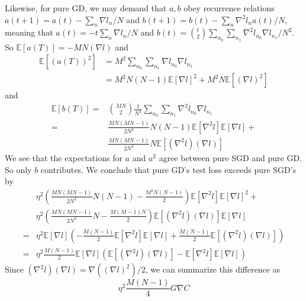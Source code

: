 \documentclass{article}
\newcommand{\expct}[1]{\mathbb{E}\left[#1\right]}
\newcommand{\wrap}[1]{\left( #1 \right)}
\begin{document}
        Likewise, for pure GD, we may demand that $a, b$ obey recurrence
        relations $a(t+1) = a(t) - \sum_n \nabla l_n/N$ and
        $b(t+1) = b(t) - \sum_n \nabla^2 l_n a(t)/N$, meaning that
        $a(t) = -t \sum_n \nabla l_n/N$ and
        $b(t) = {t \choose 2} \sum_{n_0} \sum_{n_1} \nabla^2 l_{n_0} \nabla l_{n_1}/N^2$.
        So $\expct{a(T)} = -MN(\nabla l)$ and
        \begin{align*}
            \expct{(a(T))^2}
            &=
            M^2 
            \sum_{n_0} \sum_{n_1} \nabla l_{n_0} \nabla l_{n_1} \\
            &= 
            M^2 N(N-1)  \expct{\nabla l}^2 + 
            M^2 N       \expct{(\nabla l)^2}
        \end{align*}
        and
        \begin{align*}
            \expct{b(T)}
            = 
            &{MN \choose 2}\frac{1}{N^2}
            \sum_{n_0} \sum_{n_1} \nabla^2 l_{n_0} \nabla l_{n_1} \\
            =
            &\frac{MN(MN-1)}{2N^2} N(N-1) \expct{\nabla^2 l} \expct{\nabla l} + \\
            &\frac{MN(MN-1)}{2N^2} N      \expct{(\nabla^2 l) (\nabla l)} 
        \end{align*}
        We see that the expectations for $a$ and $a^2$ agree between pure SGD and
        pure GD.  So only $b$ contributes.  We conclude that pure GD's test loss
        exceeds pure SGD's by
        \begin{align*}
               &\eta^2
                \wrap{\frac{MN(MN-1)}{2N^2} N(N-1) - \frac{M^2N(N-1)}{2}}
                \expct{\nabla^2 l} \expct{\nabla l}^2 + \\
               &\eta^2 
                \wrap{\frac{MN(MN-1)}{2N^2} N - \frac{M(M-1)N}{2}}
                \expct{(\nabla^2 l) (\nabla l)} \expct{\nabla l} \\
            = 
                &\eta^2     \expct{\nabla l} \wrap{
                -\frac{M(N-1)}{2} \expct{\nabla^2 l} \expct{\nabla l} 
                +\frac{M(N-1)}{2} \expct{(\nabla^2 l) (\nabla l)}
            } \\
            = 
                &\eta^2     \frac{M(N-1)}{2}
            \expct{\nabla l} \wrap{
                  \expct{(\nabla^2 l) (\nabla l)}
                - \expct{\nabla^2 l} \expct{\nabla l}
            }
        \end{align*}
        Since $(\nabla^2 l) (\nabla l) = \nabla((\nabla l)^2)/2$, we can 
        summarize this difference as
        $$
            \eta^2 \frac{M(N-1)}{4}
            G \nabla C 
        $$
\end{document}
